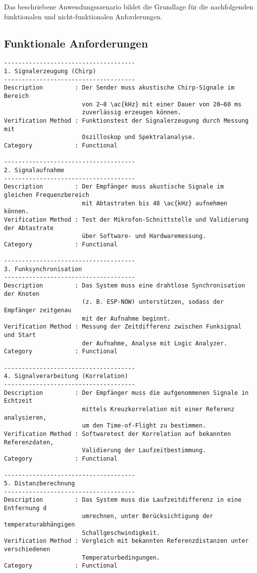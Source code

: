 Das beschriebene Anwendungsszenario bildet die Grundlage für die nachfolgenden funktionalen und nicht-funktionalen Anforderungen.



\subsection{Funktionale Anforderungen}

\begin{verbatim}
-------------------------------------
1. Signalerzeugung (Chirp)
-------------------------------------
Description         : Der Sender muss akustische Chirp-Signale im Bereich 
                      von 2–8 \ac{kHz} mit einer Dauer von 20–60 ms 
                      zuverlässig erzeugen können.
Verification Method : Funktionstest der Signalerzeugung durch Messung mit
                      Oszilloskop und Spektralanalyse.
Category            : Functional

-------------------------------------
2. Signalaufnahme
-------------------------------------
Description         : Der Empfänger muss akustische Signale im gleichen Frequenzbereich 
                      mit Abtastraten bis 48 \ac{kHz} aufnehmen können.
Verification Method : Test der Mikrofon-Schnittstelle und Validierung der Abtastrate 
                      über Software- und Hardwaremessung.
Category            : Functional

-------------------------------------
3. Funksynchronisation
-------------------------------------
Description         : Das System muss eine drahtlose Synchronisation der Knoten 
                      (z. B. ESP-NOW) unterstützen, sodass der Empfänger zeitgenau 
                      mit der Aufnahme beginnt.
Verification Method : Messung der Zeitdifferenz zwischen Funksignal und Start 
                      der Aufnahme, Analyse mit Logic Analyzer.
Category            : Functional

-------------------------------------
4. Signalverarbeitung (Korrelation)
-------------------------------------
Description         : Der Empfänger muss die aufgenommenen Signale in Echtzeit 
                      mittels Kreuzkorrelation mit einer Referenz analysieren, 
                      um den Time-of-Flight zu bestimmen.
Verification Method : Softwaretest der Korrelation auf bekannten Referenzdaten, 
                      Validierung der Laufzeitbestimmung.
Category            : Functional

-------------------------------------
5. Distanzberechnung
-------------------------------------
Description         : Das System muss die Laufzeitdifferenz in eine Entfernung d 
                      umrechnen, unter Berücksichtigung der temperaturabhängigen 
                      Schallgeschwindigkeit.
Verification Method : Vergleich mit bekannten Referenzdistanzen unter verschiedenen 
                      Temperaturbedingungen.
Category            : Functional


\end{verbatim}
